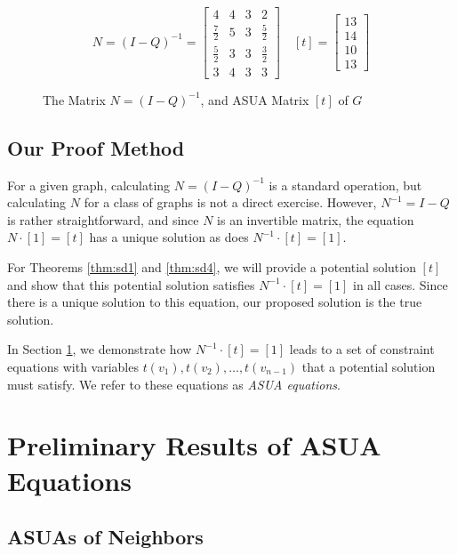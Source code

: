 \documentclass{article}
\theoremstyle{definition}
\begin{document}
\begin{figure}[h]
    \centering
    \[
    N = (I - Q)^{-1} =
    \begin{bmatrix}
    4 & 4 & 3 & 2\\
    \frac{7}{2} & 5 & 3 & \frac{5}{2} \\
    \frac{5}{2} & 3 & 3 & \frac{3}{2} \\
    3 & 4 & 3 & 3
    \end{bmatrix}
    \quad %
    [t] = 
    \begin{bmatrix}
    13  \\
    14 \\
    10 \\
    13 
    \end{bmatrix}    
    \]
    
    \caption{The Matrix $N = (I-Q)^{-1}$, and ASUA Matrix $[t]$ of $G$}
    \label{fig:c4N}
\end{figure}

\subsection{Our Proof Method}

\noindent For a given graph, calculating $N = (I - Q)^{-1}$ is a standard operation, but calculating $N$ for a class of graphs is not a direct exercise. However, $N^{-1} = I - Q$ is rather straightforward, and since $N$ is an invertible matrix, the equation $N \cdot [1] = [t]$ has a unique solution as does $N^{-1} \cdot [t] = [1]$. 

\noindent For Theorems \ref{thm:sd1} and \ref{thm:sd4}, we will provide a potential solution $[t]$ and show that this potential solution satisfies $N^{-1} \cdot [t] = [1]$ in all cases. Since there is a unique solution to this equation, our proposed solution is the true solution.

\noindent In Section \ref{sec:asuaeqs}, we demonstrate how $N^{-1} \cdot [t] = [1]$ leads to a set of constraint equations with variables $t(v_1), t(v_2), \ldots, t(v_{n-1})$ that a potential solution must satisfy. We refer to these equations as \emph{ASUA equations}.
\section{Preliminary Results of ASUA Equations}
\label{sec:asuaeqs}

\subsection{ASUAs of Neighbors}
\end{document}
